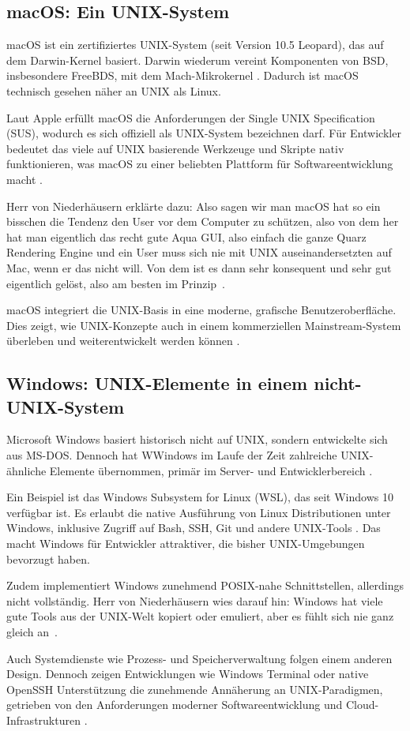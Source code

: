 \subsection{macOS: Ein UNIX-System}

macOS ist ein zertifiziertes UNIX-System (seit Version 10.5 \glqq Leopard\grqq), das auf dem Darwin-Kernel basiert. Darwin wiederum vereint Komponenten von BSD,
insbesondere FreeBDS, mit dem Mach-Mikrokernel \cite{FreeBSDOS}. Dadurch ist macOS technisch gesehen näher an UNIX als Linux.

Laut Apple erfüllt macOS die Anforderungen der Single UNIX Specification (SUS), wodurch es sich offiziell als UNIX-System bezeichnen darf. Für Entwickler bedeutet
das viele auf UNIX basierende Werkzeuge und Skripte nativ funktionieren, was macOS zu einer beliebten Plattform für Softwareentwicklung macht \cite{OSConcept}.

Herr von Niederhäusern erklärte dazu: \glqq Also sagen wir man macOS hat so ein bisschen die Tendenz den User vor dem Computer zu schützen, also von dem her hat
man eigentlich das recht gute Aqua GUI, also einfach die ganze Quarz Rendering Engine und ein User muss sich nie mit UNIX auseinandersetzten auf Mac, wenn er das
nicht will. Von dem ist es dann sehr konsequent und sehr gut eigentlich gelöst, also am besten im Prinzip\grqq \ \cite{interviewNH}.

macOS integriert die UNIX-Basis in eine moderne, grafische Benutzeroberfläche. Dies zeigt, wie UNIX-Konzepte auch in einem kommerziellen Mainstream-System überleben
und weiterentwickelt werden können \cite{FreeBSDOS}.


\newpage
\subsection{Windows: UNIX-Elemente in einem nicht-UNIX-System}

Microsoft Windows basiert historisch nicht auf UNIX, sondern entwickelte sich aus MS-DOS. Dennoch hat WWindows im Laufe der Zeit zahlreiche UNIX-ähnliche Elemente
übernommen, primär im Server- und Entwicklerbereich \cite{ModernOS}.

Ein Beispiel ist das Windows Subsystem for Linux (WSL), das seit Windows 10 verfügbar ist. Es erlaubt die native Ausführung von Linux Distributionen unter Windows,
inklusive Zugriff auf Bash, SSH, Git und andere UNIX-Tools \cite{WSL}. Das macht Windows für Entwickler attraktiver, die bisher UNIX-Umgebungen bevorzugt haben.

Zudem implementiert Windows zunehmend POSIX-nahe Schnittstellen, allerdings nicht vollständig. Herr von Niederhäusern wies darauf hin: \glqq Windows hat viele gute
Tools aus der UNIX-Welt kopiert oder emuliert, aber es fühlt sich nie ganz gleich an\grqq \ \cite{interviewNH}.

Auch Systemdienste wie Prozess- und Speicherverwaltung folgen einem anderen Design. Dennoch zeigen Entwicklungen wie Windows Terminal oder native OpenSSH
Unterstützung die zunehmende Annäherung an UNIX-Paradigmen, getrieben von den Anforderungen moderner Softwareentwicklung und Cloud-Infrastrukturen
\cite{ArtOfUnixProgramming, OSConcept}.
